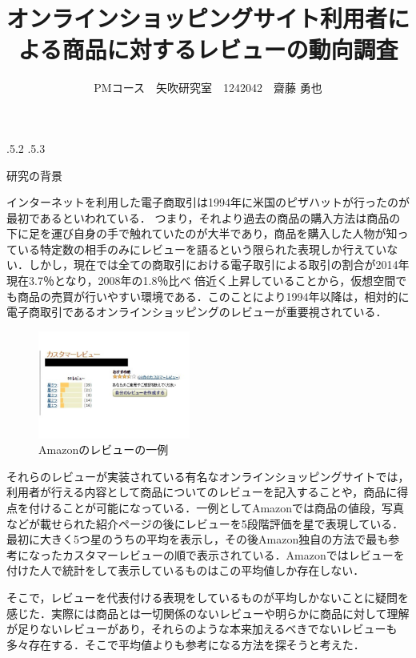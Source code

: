 \documentclass[uplatex]{jsarticle}
\title{\vspace{-14mm}オンラインショッピングサイト利用者による商品に対するレビューの動向調査}
\author{PMコース　矢吹研究室　1242042　齋藤 勇也}
\date{}%
\makeatletter
\renewcommand{\section}{%
    \if@slide\clearpage\fi
    \@startsection{section}{1}{\z@}%
    {\Cvs \@plus.5\Cdp \@minus.2\Cdp}%
    {.5\Cvs \@plus.3\Cdp}%
    {\normalfont\raggedright}}
\makeatother
\begin{document}
\maketitle





\section{研究の背景}

インターネットを利用した電子商取引は1994年に米国のピザハットが行ったのが最初であるといわれている．\cite{sugasaka2003}
つまり，それより過去の商品の購入方法は商品の下に足を運び自身の手で触れていたのが大半であり，商品を購入した人物が知っている特定数の相手のみにレビューを語るという限られた表現しか行えていない．しかし，現在では全ての商取引における電子取引による取引の割合が2014年現在3.7％となり，2008年の1.8％比べ 倍近く上昇していることから，仮想空間でも商品の売買が行いやすい環境である．\cite{keizai2014}このことにより1994年以降は，相対的に電子商取引であるオンラインショッピングのレビューが重要視されている．

\begin{figure}
\vspace*{-\intextsep}
\includegraphics[width=5cm,clip]{customerReview.pdf}
\caption{Amazonのレビューの一例}\label{サンプル図}
\end{figure}

それらのレビューが実装されている有名なオンラインショッピングサイトでは，利用者が行える内容として商品についてのレビューを記入することや，商品に得点を付けることが可能になっている．一例としてAmazonでは商品の値段，写真などが載せられた紹介ページの後にレビューを5段階評価を星で表現している．最初に大きく5つ星のうちの平均を表示し，その後Amazon独自の方法で最も参考になったカスタマーレビューの順で表示されている．Amazonではレビューを付けた人で統計をして表示しているものはこの平均値しか存在しない．

そこで，レビューを代表付ける表現をしているものが平均しかないことに疑問を感じた．実際には商品とは一切関係のないレビューや明らかに商品に対して理解が足りないレビューがあり，それらのような本来加えるべきでないレビューも多々存在する．そこで平均値よりも参考になる方法を探そうと考えた．
\cite{hattori2011} 
\cite{yamazawa2006}
\end{document}
